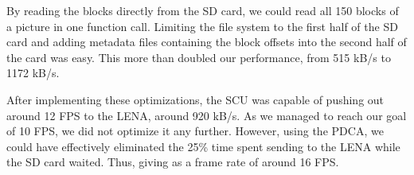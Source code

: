 \begin{description}
		By reading the blocks directly from the SD card, we could read
		all 150 blocks of a picture in one function call. Limiting the
		file system to the first half of the SD card and adding metadata
		files containing the block offsets into the second half of the
		card was easy. This more than doubled our performance, from 515
		kB/s to 1172 kB/s.
\end{description}

After implementing these optimizations, the \ac{SCU} was capable of pushing out around
12 FPS to the \ac{LENA}, around 920 kB/s. As we managed to reach our goal of 10
FPS, we did not optimize it any further. However, using the \ac{PDCA}, we could
have effectively eliminated the 25\% time spent sending to the \ac{LENA} while
the \ac{SD} card waited. Thus, giving as a frame rate of around 16
FPS. 


